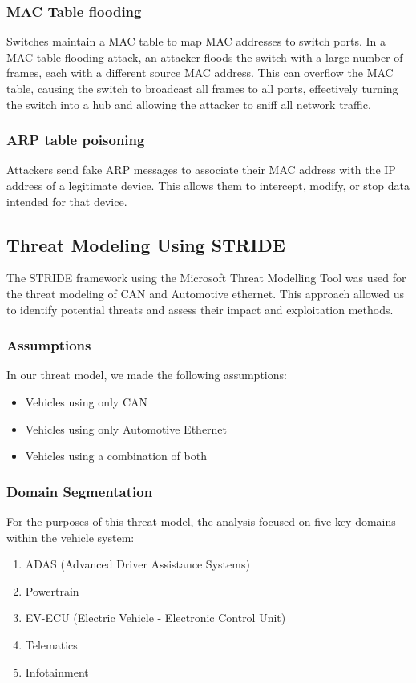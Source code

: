 \documentclass{report}
\begin{document}
\subsubsection{MAC Table flooding}
Switches maintain a MAC table to map MAC addresses to switch ports. In a MAC table flooding attack, an attacker floods the switch with a large number of frames, each with a different source MAC address. This can overflow the MAC table, causing the switch to broadcast all frames to all ports, effectively turning the switch into a hub and allowing the attacker to sniff all network traffic.

\subsubsection{ARP table poisoning}
Attackers send fake ARP messages to associate their MAC address with the IP address of a legitimate device. This allows them to intercept, modify, or stop data intended for that device.

\subsection{Threat Modeling Using STRIDE}
The STRIDE framework using the Microsoft Threat Modelling Tool was used for the threat modeling of CAN and Automotive ethernet. This approach allowed us to identify potential threats and assess their impact and exploitation methods. 

\subsubsection{Assumptions}
In our threat model, we made the following assumptions:
\begin{itemize}
    \item Vehicles using only CAN
    \item Vehicles using only Automotive Ethernet
    \item Vehicles using a combination of both
    
\end{itemize}

\subsubsection{Domain Segmentation}
For the purposes of this threat model, the analysis focused on five key domains within the vehicle system:
\begin{enumerate}
    \item ADAS (Advanced Driver Assistance Systems)
    \item Powertrain
    \item EV-ECU (Electric Vehicle - Electronic Control Unit)
    \item Telematics
    \item Infotainment
\end{enumerate}
\end{document}
